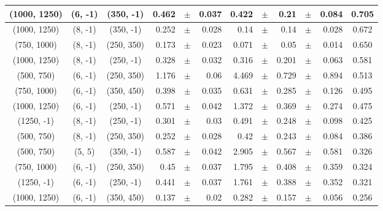 \documentclass[12pt]{paper}
\begin{document}
\begin{table}[ht]
\begin{center}
{\begin{tabular}{|c|c|c|rrr|rrrrr|c|}
(1000, 1250)&(6, -1)&(350, -1)&0.462&$\pm$&0.037&0.422&$\pm$&0.21&$\pm$&0.084&0.705\\\hline
(1000, 1250)&(8, -1)&(350, -1)&0.252&$\pm$&0.028&0.14&$\pm$&0.14&$\pm$&0.028&0.672\\\hline
(750, 1000)&(8, -1)&(250, 350)&0.173&$\pm$&0.023&0.071&$\pm$&0.05&$\pm$&0.014&0.650\\\hline
(1000, 1250)&(8, -1)&(250, -1)&0.328&$\pm$&0.032&0.316&$\pm$&0.201&$\pm$&0.063&0.581\\\hline
(500, 750)&(6, -1)&(250, 350)&1.176&$\pm$&0.06&4.469&$\pm$&0.729&$\pm$&0.894&0.513\\\hline
(750, 1000)&(6, -1)&(350, 450)&0.398&$\pm$&0.035&0.631&$\pm$&0.285&$\pm$&0.126&0.495\\\hline
(1000, 1250)&(6, -1)&(250, -1)&0.571&$\pm$&0.042&1.372&$\pm$&0.369&$\pm$&0.274&0.475\\\hline
(1250, -1)&(8, -1)&(250, -1)&0.301&$\pm$&0.03&0.491&$\pm$&0.248&$\pm$&0.098&0.425\\\hline
(500, 750)&(8, -1)&(250, 350)&0.252&$\pm$&0.028&0.42&$\pm$&0.243&$\pm$&0.084&0.386\\\hline
(500, 750)&(5, 5)&(350, -1)&0.587&$\pm$&0.042&2.905&$\pm$&0.567&$\pm$&0.581&0.326\\\hline
(750, 1000)&(6, -1)&(250, 350)&0.45&$\pm$&0.037&1.795&$\pm$&0.408&$\pm$&0.359&0.324\\\hline
(1250, -1)&(6, -1)&(250, -1)&0.441&$\pm$&0.037&1.761&$\pm$&0.388&$\pm$&0.352&0.321\\\hline
(1000, 1250)&(6, -1)&(350, 450)&0.137&$\pm$&0.02&0.282&$\pm$&0.157&$\pm$&0.056&0.256\\\hline

\end{tabular}}
\end{center}
\end{table}
\end{document}
